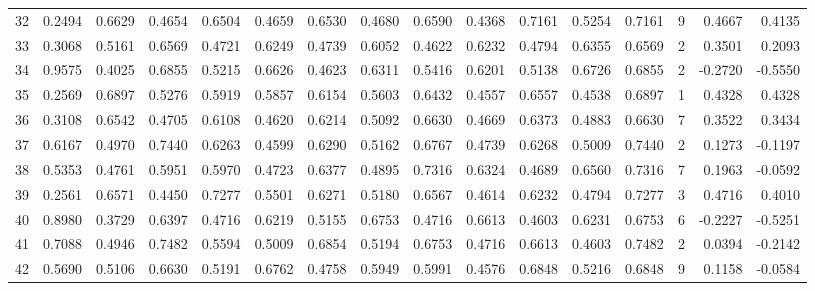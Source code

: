 \begin{tabular}{lrrrrrrrrrrrrrrr}
32  &      0.2494 &  0.6629 &  0.4654 &  0.6504 &  0.4659 &  0.6530 &  0.4680 &  0.6590 &  0.4368 &  0.7161 &   0.5254 &     0.7161 &      9 &                    0.4667 &                     0.4135 \\
33  &      0.3068 &  0.5161 &  0.6569 &  0.4721 &  0.6249 &  0.4739 &  0.6052 &  0.4622 &  0.6232 &  0.4794 &   0.6355 &     0.6569 &      2 &                    0.3501 &                     0.2093 \\
34  &      0.9575 &  0.4025 &  0.6855 &  0.5215 &  0.6626 &  0.4623 &  0.6311 &  0.5416 &  0.6201 &  0.5138 &   0.6726 &     0.6855 &      2 &                   -0.2720 &                    -0.5550 \\
35  &      0.2569 &  0.6897 &  0.5276 &  0.5919 &  0.5857 &  0.6154 &  0.5603 &  0.6432 &  0.4557 &  0.6557 &   0.4538 &     0.6897 &      1 &                    0.4328 &                     0.4328 \\
36  &      0.3108 &  0.6542 &  0.4705 &  0.6108 &  0.4620 &  0.6214 &  0.5092 &  0.6630 &  0.4669 &  0.6373 &   0.4883 &     0.6630 &      7 &                    0.3522 &                     0.3434 \\
37  &      0.6167 &  0.4970 &  0.7440 &  0.6263 &  0.4599 &  0.6290 &  0.5162 &  0.6767 &  0.4739 &  0.6268 &   0.5009 &     0.7440 &      2 &                    0.1273 &                    -0.1197 \\
38  &      0.5353 &  0.4761 &  0.5951 &  0.5970 &  0.4723 &  0.6377 &  0.4895 &  0.7316 &  0.6324 &  0.4689 &   0.6560 &     0.7316 &      7 &                    0.1963 &                    -0.0592 \\
39  &      0.2561 &  0.6571 &  0.4450 &  0.7277 &  0.5501 &  0.6271 &  0.5180 &  0.6567 &  0.4614 &  0.6232 &   0.4794 &     0.7277 &      3 &                    0.4716 &                     0.4010 \\
40  &      0.8980 &  0.3729 &  0.6397 &  0.4716 &  0.6219 &  0.5155 &  0.6753 &  0.4716 &  0.6613 &  0.4603 &   0.6231 &     0.6753 &      6 &                   -0.2227 &                    -0.5251 \\
41  &      0.7088 &  0.4946 &  0.7482 &  0.5594 &  0.5009 &  0.6854 &  0.5194 &  0.6753 &  0.4716 &  0.6613 &   0.4603 &     0.7482 &      2 &                    0.0394 &                    -0.2142 \\
42  &      0.5690 &  0.5106 &  0.6630 &  0.5191 &  0.6762 &  0.4758 &  0.5949 &  0.5991 &  0.4576 &  0.6848 &   0.5216 &     0.6848 &      9 &                    0.1158 &                    -0.0584 \\

\end{tabular}
